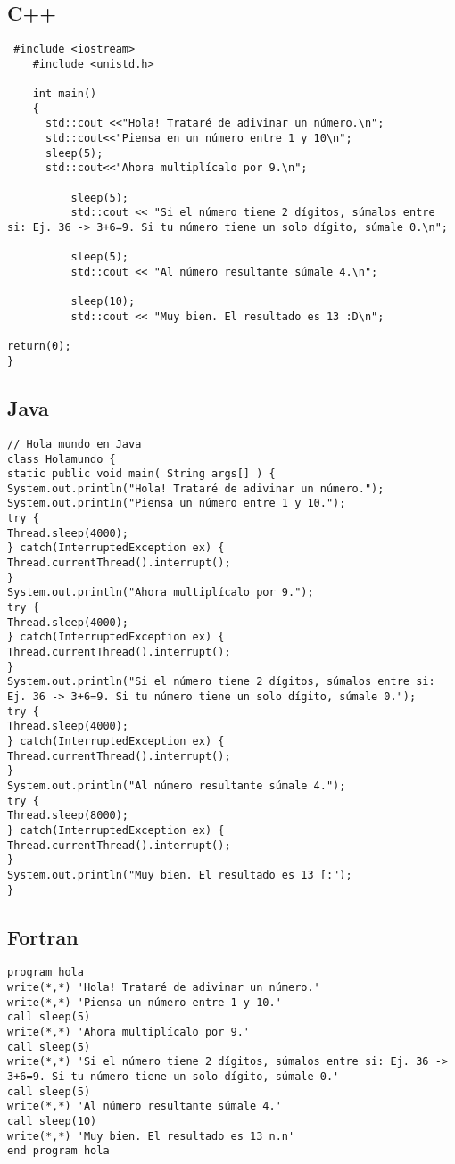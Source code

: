 \documentclass[10pt]{article}
\begin{document}
\subsection{C++}
\begin{verbatim}
 #include <iostream>
	#include <unistd.h>
	 
	int main()
	{
	  std::cout <<"Hola! Trataré de adivinar un número.\n";
	  std::cout<<"Piensa en un número entre 1 y 10\n";
	  sleep(5);
	  std::cout<<"Ahora multiplícalo por 9.\n";

          sleep(5);
          std::cout << "Si el número tiene 2 dígitos, súmalos entre si: Ej. 36 -> 3+6=9. Si tu número tiene un solo dígito, súmale 0.\n";

          sleep(5);
          std::cout << "Al número resultante súmale 4.\n";
       
          sleep(10);
          std::cout << "Muy bien. El resultado es 13 :D\n";

return(0);
}
\end{verbatim}
\subsection{Java}
\begin{verbatim} 
// Hola mundo en Java
class Holamundo {
static public void main( String args[] ) {
System.out.println("Hola! Trataré de adivinar un número.");
System.out.printIn("Piensa un número entre 1 y 10.");
try {
Thread.sleep(4000);
} catch(InterruptedException ex) {
Thread.currentThread().interrupt();
}
System.out.println("Ahora multiplícalo por 9.");
try {
Thread.sleep(4000);
} catch(InterruptedException ex) {
Thread.currentThread().interrupt();
}
System.out.println("Si el número tiene 2 dígitos, súmalos entre si: Ej. 36 -> 3+6=9. Si tu número tiene un solo dígito, súmale 0.");
try {
Thread.sleep(4000);
} catch(InterruptedException ex) {
Thread.currentThread().interrupt();
}
System.out.println("Al número resultante súmale 4.");
try {
Thread.sleep(8000);
} catch(InterruptedException ex) {
Thread.currentThread().interrupt();
}
System.out.println("Muy bien. El resultado es 13 [:");
}
\end{verbatim}
\subsection{Fortran}
\begin{verbatim} 
program hola
write(*,*) 'Hola! Trataré de adivinar un número.'
write(*,*) 'Piensa un número entre 1 y 10.'
call sleep(5)
write(*,*) 'Ahora multiplícalo por 9.'
call sleep(5)
write(*,*) 'Si el número tiene 2 dígitos, súmalos entre si: Ej. 36 -> 3+6=9. Si tu número tiene un solo dígito, súmale 0.'
call sleep(5)
write(*,*) 'Al número resultante súmale 4.'
call sleep(10)
write(*,*) 'Muy bien. El resultado es 13 n.n'
end program hola
\end{verbatim}
\end{document}
